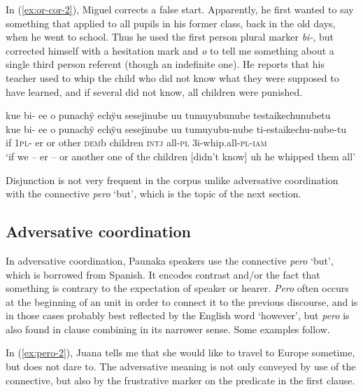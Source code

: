 In (\ref{ex:or-cor-2}), Miguel corrects a false start. Apparently, he first wanted to say something that applied to all pupils in his former class, back in the old days, when he went to school. Thus he used the first person plural marker \textit{bi-}, but corrected himself with a hesitation mark and \textit{o} to tell me something about a single third person referent (though an indefinite one). He reports that his teacher used to whip the child who did not know what they were supposed to have learned, and if several did not know, all children were punished.

\ea\label{ex:or-cor-2}
\begingl
\glpreamble kue bi- ee o punachÿ echÿu sesejinube uu tumuyubunube testaikechunubetu\\
\gla kue bi- ee o punachÿ echÿu sesejinube uu tumuyubu-nube ti-estaikechu-nube-tu\\
\glb if 1\textsc{pl}- er or other \textsc{dem}b children \textsc{intj} all-\textsc{pl} 3i-whip.all-\textsc{pl}-\textsc{iam}\\
\glft ‘if we – er – or another one of the children [didn’t know] uh he whipped them all’
\endgl
\trailingcitation{[mxx-p181027l-1.077]}
\xe 

Disjunction is not very frequent in the corpus unlike adversative coordination with the connective \textit{pero} ‘but’, which is the topic of the next section.

\subsection{Adversative coordination}\label{sec:AdversativeCoordination}

In adversative coordination, Paunaka speakers use the connective \textit{pero} ‘but’, which is borrowed from Spanish. It encodes contrast and/or the fact that something is contrary to the expectation of speaker or hearer. \textit{Pero} often occurs at the beginning of an  unit in order to connect it to the previous discourse, and is in those cases probably best reflected by the English word ‘however’, but \textit{pero} is also found in clause combining in its narrower sense. Some examples follow.

In (\ref{ex:pero-2}), Juana tells me that she would like to travel to Europe sometime, but does not dare to. The adversative meaning is not only conveyed by use of the connective, but also by the frustrative marker on the predicate in the first clause.

